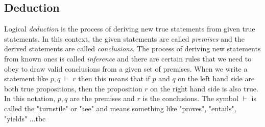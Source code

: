 



\subsection{Deduction}
Logical \emph{deduction} is the process of deriving new true statements from given true statements. In this context, the given statements are called \emph{premises} and the derived statements are called \emph{conclusions}. The process of deriving new statements from known ones is called \emph{inference} and there are certain rules that we need to obey to draw valid conclusions from a given set of premises. When we write a statement like $p,q \;\vdash\; r$ then this means that if $p$ and $q$ on the left hand side are both true propositions, then the proposition $r$ on the right hand side is also true. In this notation, $p,q$ are the premises and $r$ is the conclusions. The symbol $\vdash$ is called the "turnstile" or "tee" and means something like "proves", "entails", "yields"  ...tbc






